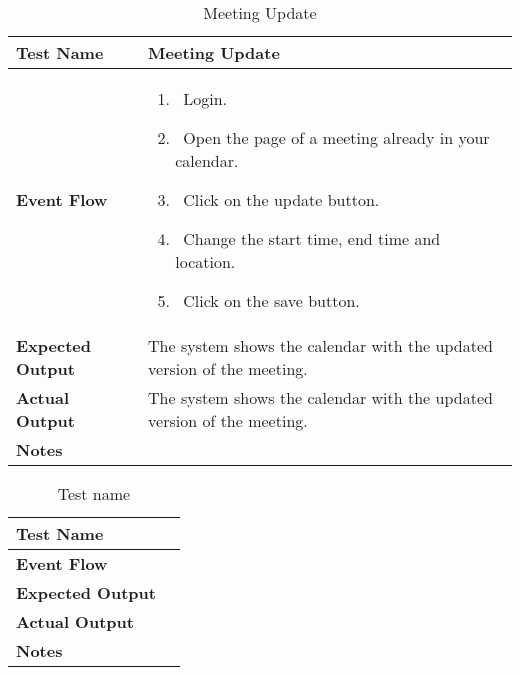 \begin{table}[h]	
\centering
\def\arraystretch{1.5}
\begin{tabular}{|m{7cm}|m{7cm}|}
	\hline
	\textbf{Test Name}            &  Meeting Update  \\ \hline
	\textbf{Event Flow}             & 
		\begin{enumerate}
			\item~Login.
			\item~Open the page of a meeting already in your calendar.
			\item~Click on the update button.
			\item~Change the start time, end time and location.
			\item~Click on the save button.
		\end{enumerate}
	\\ \hline
	\textbf{Expected Output}  &  The system shows the calendar with the updated version of the meeting.   \\ \hline
	\textbf{Actual Output}       &  The system shows the calendar with the updated version of the meeting.   \\ \hline
	\textbf{Notes} & \\ \hline
\end{tabular}
\caption{Meeting Update}
\end{table}


\begin{table}[h]	
\centering
\def\arraystretch{1.5}
\begin{tabular}{|m{7cm}|m{7cm}|}
	\hline
	\textbf{Test Name}            &    \\ \hline
	\textbf{Event Flow}             &   \\ \hline
	\textbf{Expected Output}  &     \\ \hline
	\textbf{Actual Output}       &     \\ \hline
	\textbf{Notes} & \\ \hline
\end{tabular}
\caption{Test name}
\end{table}


